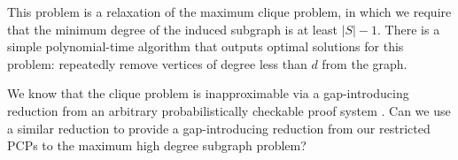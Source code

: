 \documentclass{article}
\begin{document}
This problem is a relaxation of the maximum clique problem, in which we require that the minimum degree of the induced subgraph is at least $|S| - 1$.
There is a simple polynomial-time algorithm that outputs optimal solutions for this problem: repeatedly remove vertices of degree less than $d$ from the graph.

We know that the clique problem is inapproximable via a gap-introducing reduction from an arbitrary probabilistically checkable proof system \autocite{fglss91}.
Can we use a similar reduction to provide a gap-introducing reduction from our restricted PCPs to the maximum high degree subgraph problem?




\end{document}
